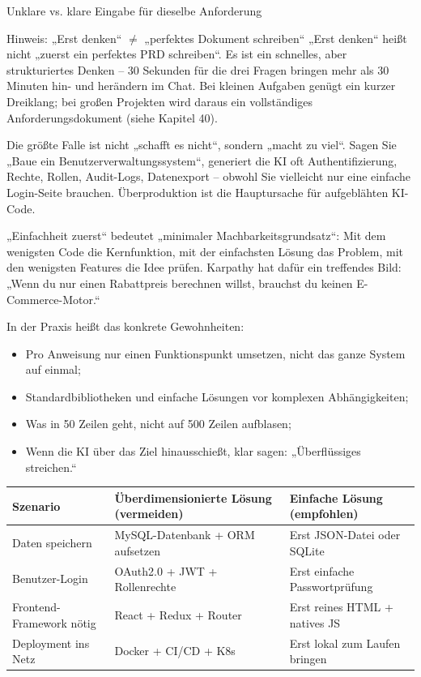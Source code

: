 \begin{center}\small\color{gray}Unklare vs. klare Eingabe für dieselbe Anforderung\end{center}

\begin{tcbwarn}{Hinweis: „Erst denken“ $\neq$ „perfektes Dokument schreiben“}
„Erst denken“ heißt nicht „zuerst ein perfektes PRD schreiben“. Es ist ein schnelles, aber strukturiertes Denken – 30 Sekunden für die drei Fragen bringen mehr als 30 Minuten hin- und herändern im Chat. Bei kleinen Aufgaben genügt ein kurzer Dreiklang; bei großen Projekten wird daraus ein vollständiges Anforderungsdokument (siehe Kapitel 40).

\end{tcbwarn}


Die größte Falle ist nicht „schafft es nicht“, sondern „macht zu viel“. Sagen Sie „Baue ein Benutzerverwaltungssystem“, generiert die KI oft Authentifizierung, Rechte, Rollen, Audit-Logs, Datenexport – obwohl Sie vielleicht nur eine einfache Login-Seite brauchen. Überproduktion ist die Hauptursache für aufgeblähten KI-Code.

„Einfachheit zuerst“ bedeutet „minimaler Machbarkeitsgrundsatz“: Mit dem wenigsten Code die Kernfunktion, mit der einfachsten Lösung das Problem, mit den wenigsten Features die Idee prüfen. Karpathy hat dafür ein treffendes Bild: „Wenn du nur einen Rabattpreis berechnen willst, brauchst du keinen E-Commerce-Motor.“

In der Praxis heißt das konkrete Gewohnheiten:

\begin{itemize}
  \item Pro Anweisung nur einen Funktionspunkt umsetzen, nicht das ganze System auf einmal;
  \item Standardbibliotheken und einfache Lösungen vor komplexen Abhängigkeiten;
  \item Was in 50 Zeilen geht, nicht auf 500 Zeilen aufblasen;
  \item Wenn die KI über das Ziel hinausschießt, klar sagen: „Überflüssiges streichen.“
\end{itemize}

\begin{center}
\begin{tabularx}{\linewidth}{|X|X|X|}
\hline
\textbf{Szenario} & \textbf{Überdimensionierte Lösung (vermeiden)} & \textbf{Einfache Lösung (empfohlen)} \tabularnewline
\hline
Daten speichern & MySQL-Datenbank + ORM aufsetzen & Erst JSON-Datei oder SQLite \tabularnewline
Benutzer-Login & OAuth2.0 + JWT + Rollenrechte & Erst einfache Passwortprüfung \tabularnewline
Frontend-Framework nötig & React + Redux + Router & Erst reines HTML + natives JS \tabularnewline
Deployment ins Netz & Docker + CI/CD + K8s & Erst lokal zum Laufen bringen \tabularnewline
\hline
\end{tabularx}
\end{center}

